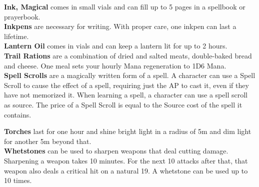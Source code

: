 \textbf{Ink, Magical} comes in small vials and can fill up to 5 pages in a spellbook or prayerbook.\\

\textbf{Inkpens} are necessary for writing.
With proper care, one inkpen can last a lifetime.\\

\textbf{Lantern Oil} comes in vials and can keep a lantern lit for up to 2 hours.\\

\textbf{Trail Rations} are a combination of dried and salted meats, double-baked bread and cheese.
One meal sets your hourly Mana regeneration to 1D6 Mana.\\

\textbf{Spell Scrolls} are a magically written form of a spell.
A character can use a Spell Scroll to cause the effect of a spell, requiring just the AP to cast it, even if they have not memorized it.
When learning a spell, a character can use a spell scroll as source.
The price of a Spell Scroll is equal to the Source cost of the spell it contains.

\textbf{Torches} last for one hour and shine bright light in a radius of 5m and dim light for another 5m beyond that.\\

\textbf{Whetstones} can be used to sharpen weapons that deal cutting damage.
Sharpening a weapon takes 10 minutes.
For the next 10 attacks after that, that weapon also deals a critical hit on a natural 19.
A whetstone can be used up to 10 times.\\
